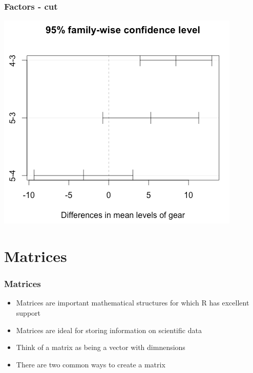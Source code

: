 \documentclass{beamer}
\begin{document}
\begin{frame}[fragile]
\frametitle{Factors - cut}
\begin{center}
\includegraphics{../IMG/tukey.png}
\end{center}
\end{frame}

\section{Matrices}
\begin{frame}[fragile]
\frametitle{Matrices}
\begin{itemize}

\item Matrices are important mathematical structures for which R has excellent support
\vspace{0.15cm}
\item Matrices are ideal for storing information on scientific data
\vspace{0.15cm}
\item Think of a matrix as being a vector with dimnensions
\vspace{0.15cm}
\item There are two common ways to create a matrix

\end{itemize}

\end{frame}
\end{document}
